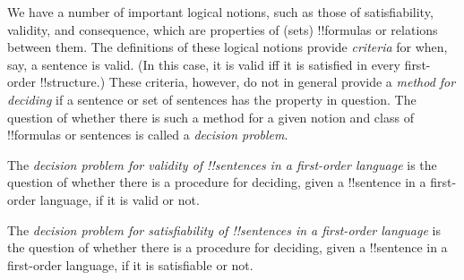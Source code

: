 \documentclass[../../include/open-logic-section]{subfiles}
\begin{document}

\begin{explain}
We have a number of important logical notions, such as those of
satisfiability, validity, and consequence, which are properties of
(sets) !!{formula}s or relations between them.  The definitions of these
logical notions provide \emph{criteria} for when, say, a sentence is
valid. (In this case, it is valid iff it is satisfied in every first-order
!!{structure}.)  These criteria, however, do not in general provide a
\emph{method for deciding} if a sentence or set of sentences has the
property in question.  The question of whether there is such a method
for a given notion and class of !!{formula}s or sentences is called a
\emph{decision problem}.
\end{explain}

\begin{ex}
The \emph{decision problem for validity of !!{sentence}s in a first-order
  language} is the question of whether there is a procedure for
deciding, given a !!{sentence} in a first-order language, if it is valid
or not.
\end{ex}

\begin{ex}
The \emph{decision problem for satisfiability of !!{sentence}s in a first-order
  language} is the question of whether there is a procedure for
deciding, given a !!{sentence} in a first-order language, if it is satisfiable
or not.
\end{ex}
\end{document}
